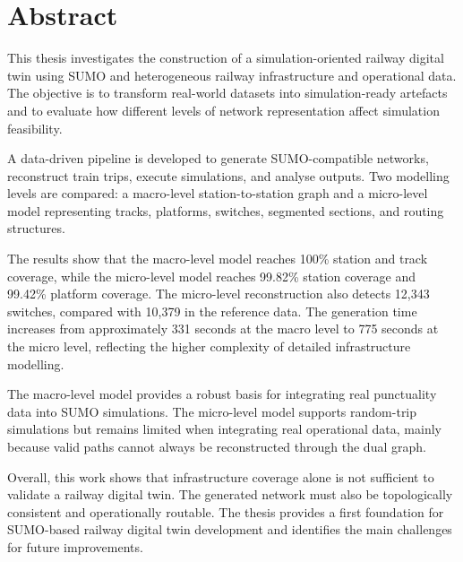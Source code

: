 \chapter*{Abstract}
This thesis investigates the construction of a simulation-oriented railway digital twin using SUMO and heterogeneous 
railway infrastructure and operational data. The objective is to transform real-world datasets into simulation-ready 
artefacts and to evaluate how different levels of network representation affect simulation feasibility.

A data-driven pipeline is developed to generate SUMO-compatible networks, reconstruct train trips, execute simulations, 
and analyse outputs. Two modelling levels are compared: a macro-level station-to-station graph and a micro-level model 
representing tracks, platforms, switches, segmented sections, and routing structures.

The results show that the macro-level model reaches 100\% station and track coverage, while the micro-level model reaches 
99.82\% station coverage and 99.42\% platform coverage. The micro-level reconstruction also detects 12,343 switches, 
compared with 10,379 in the reference data. The generation time increases from approximately 331 seconds at the macro 
level to 775 seconds at the micro level, reflecting the higher complexity of detailed infrastructure modelling.

The macro-level model provides a robust basis for integrating real punctuality data into SUMO simulations. The 
micro-level model supports random-trip simulations but remains limited when integrating real operational data, mainly 
because valid paths cannot always be reconstructed through the dual graph.

Overall, this work shows that infrastructure coverage alone is not sufficient to validate a railway digital twin. The 
generated network must also be topologically consistent and operationally routable. The thesis provides a first 
foundation for SUMO-based railway digital twin development and identifies the main challenges for future improvements.